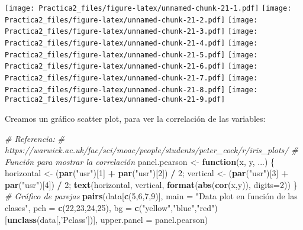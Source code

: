 \documentclass[]{article}
\newenvironment{Shaded}{\begin{snugshade}}{\end{snugshade}}
\newcommand{\KeywordTok}[1]{\textcolor[rgb]{0.13,0.29,0.53}{\textbf{#1}}}
\newcommand{\DataTypeTok}[1]{\textcolor[rgb]{0.13,0.29,0.53}{#1}}
\newcommand{\DecValTok}[1]{\textcolor[rgb]{0.00,0.00,0.81}{#1}}
\newcommand{\StringTok}[1]{\textcolor[rgb]{0.31,0.60,0.02}{#1}}
\newcommand{\CommentTok}[1]{\textcolor[rgb]{0.56,0.35,0.01}{\textit{#1}}}
\newcommand{\ControlFlowTok}[1]{\textcolor[rgb]{0.13,0.29,0.53}{\textbf{#1}}}
\newcommand{\OperatorTok}[1]{\textcolor[rgb]{0.81,0.36,0.00}{\textbf{#1}}}
\newcommand{\NormalTok}[1]{#1}
\begin{document}
\texttt{[image: Practica2\_files/figure-latex/unnamed-chunk-21-1.pdf]}
\texttt{[image: Practica2\_files/figure-latex/unnamed-chunk-21-2.pdf]}
\texttt{[image: Practica2\_files/figure-latex/unnamed-chunk-21-3.pdf]}
\texttt{[image: Practica2\_files/figure-latex/unnamed-chunk-21-4.pdf]}
\texttt{[image: Practica2\_files/figure-latex/unnamed-chunk-21-5.pdf]}
\texttt{[image: Practica2\_files/figure-latex/unnamed-chunk-21-6.pdf]}
\texttt{[image: Practica2\_files/figure-latex/unnamed-chunk-21-7.pdf]}
\texttt{[image: Practica2\_files/figure-latex/unnamed-chunk-21-8.pdf]}
\texttt{[image: Practica2\_files/figure-latex/unnamed-chunk-21-9.pdf]}

Creamos un gráfico scatter plot, para ver la correlación de las
variables:

\begin{Shaded}
\begin{Highlighting}[]
\CommentTok{# Referencia:}
\CommentTok{# https://warwick.ac.uk/fac/sci/moac/people/students/peter_cock/r/iris_plots/}
\CommentTok{# Función para mostrar la correlación}
\NormalTok{panel.pearson <-}\StringTok{ }\ControlFlowTok{function}\NormalTok{(x, y, ...) \{}
\NormalTok{horizontal <-}\StringTok{ }\NormalTok{(}\KeywordTok{par}\NormalTok{(}\StringTok{"usr"}\NormalTok{)[}\DecValTok{1}\NormalTok{] }\OperatorTok{+}\StringTok{ }\KeywordTok{par}\NormalTok{(}\StringTok{"usr"}\NormalTok{)[}\DecValTok{2}\NormalTok{]) }\OperatorTok{/}\StringTok{ }\DecValTok{2}\NormalTok{;}
\NormalTok{vertical <-}\StringTok{ }\NormalTok{(}\KeywordTok{par}\NormalTok{(}\StringTok{"usr"}\NormalTok{)[}\DecValTok{3}\NormalTok{] }\OperatorTok{+}\StringTok{ }\KeywordTok{par}\NormalTok{(}\StringTok{"usr"}\NormalTok{)[}\DecValTok{4}\NormalTok{]) }\OperatorTok{/}\StringTok{ }\DecValTok{2}\NormalTok{;}
\KeywordTok{text}\NormalTok{(horizontal, vertical, }\KeywordTok{format}\NormalTok{(}\KeywordTok{abs}\NormalTok{(}\KeywordTok{cor}\NormalTok{(x,y)), }\DataTypeTok{digits=}\DecValTok{2}\NormalTok{))}
\NormalTok{\}}
\CommentTok{# Gráfico de parejas}
\KeywordTok{pairs}\NormalTok{(data[}\KeywordTok{c}\NormalTok{(}\DecValTok{5}\NormalTok{,}\DecValTok{6}\NormalTok{,}\DecValTok{7}\NormalTok{,}\DecValTok{9}\NormalTok{)], }\DataTypeTok{main =} \StringTok{"Data plot en función de las clases"}\NormalTok{, }\DataTypeTok{pch =} \KeywordTok{c}\NormalTok{(}\DecValTok{22}\NormalTok{,}\DecValTok{23}\NormalTok{,}\DecValTok{24}\NormalTok{,}\DecValTok{25}\NormalTok{),}
      \DataTypeTok{bg =} \KeywordTok{c}\NormalTok{(}\StringTok{"yellow"}\NormalTok{,}\StringTok{"blue"}\NormalTok{,}\StringTok{"red"}\NormalTok{) [}\KeywordTok{unclass}\NormalTok{(data[,}\StringTok{'Pclass'}\NormalTok{])],}
      \DataTypeTok{upper.panel =}\NormalTok{ panel.pearson)}
\end{Highlighting}
\end{Shaded}
\end{document}
